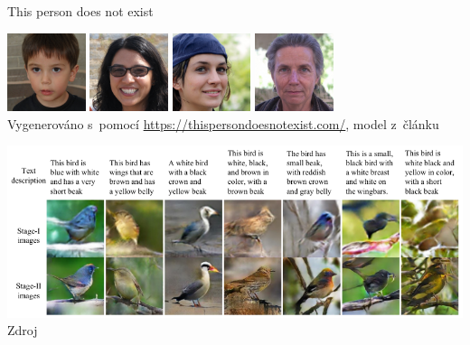 \documentclass[handout,aspectratio=169,dvipsnames]{beamer}
\begin{document}

\begin{frame}{This person does not exist}

    \centering
    \includegraphics[width=65pt]{img/person1.jpeg}
    \includegraphics[width=65pt]{img/person2.jpeg}
    \includegraphics[width=65pt]{img/person3.jpeg}
    \includegraphics[width=65pt]{img/person4.jpeg} \\
    {\tiny Vygenerováno s~pomocí \url{https://thispersondoesnotexist.com/},
    model z~článku \citet{karras2020analyzing}}

    \includegraphics[scale=.35]{img/gan_birds.png} \\
    {\tiny Zdroj \citet[obr.\ 5]{zhang2017stack}}

\end{frame}

\end{document}
